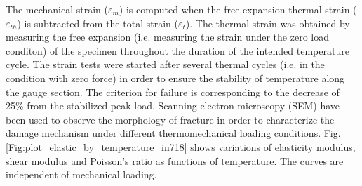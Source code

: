 \documentclass[preprint,5p,twocolumn,11pt,sort&compress]{elsarticle}
\begin{document}


The mechanical strain ($\varepsilon_{m}$) is computed when the free expansion thermal strain ($\varepsilon_{th}$) is subtracted from the total strain ($\varepsilon_{t}$). The thermal strain was obtained by measuring the free expansion (i.e. measuring the strain under the zero load conditon) of the specimen throughout the duration of the intended temperature cycle. The strain tests were started after several thermal cycles (i.e. in the condition with zero force) in order to ensure the stability of temperature along the gauge section.
The criterion for failure is corresponding to the decrease of 25\% from the stabilized peak load. Scanning electron microscopy (SEM) have been used to observe the morphology of fracture in order to characterize the damage mechanism under different thermomechanical loading conditions.
Fig. \ref{Fig:plot_elastic_by_temperature_in718} shows variations of elasticity modulus, shear modulus and Poisson's ratio as functions of temperature. The curves are independent of mechanical loading.
\end{document}
